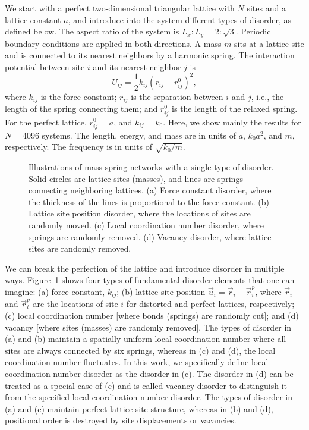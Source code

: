 \documentclass[twocolumn,printnumbers,amsmath,amssymb,prl,verbatim]{revtex4}
\begin{document}
We start with a perfect two-dimensional triangular lattice with $N$ sites and a lattice constant $a$, and introduce into the system different types of disorder, as defined below. The aspect ratio of the system is $L_x:L_y = 2: \sqrt{3}$. Periodic boundary conditions are applied in both directions. A mass $m$ sits at a lattice site and is connected to its nearest neighbors by a harmonic spring. The interaction potential between site $i$ and its nearest neighbor $j$ is
\begin{equation}
U_{ij} = \frac{1}{2}k_{ij}(r_{ij} - r_{ij}^0)^2,
\end{equation}
where $k_{ij}$ is the force constant; $r_{ij}$ is the separation between $i$ and $j$, i.e., the length of the spring connecting them; and $r_{ij}^0$ is the length of the relaxed spring. For the perfect lattice, $r_{ij}^0=a$, and $k_{ij}=k_0$. Here, we show mainly the results for $N=4096$ systems. The length, energy, and mass are in units of $a$, $k_0a^2$, and $m$, respectively. The frequency is in units of $\sqrt{k_0/m}$.

\begin{figure}
\caption{\label{fig:fig1} Illustrations of mass-spring networks with a single type of disorder. Solid circles are lattice sites (masses), and lines are springs connecting neighboring lattices. (a) Force constant disorder, where the thickness of the lines is proportional to the force constant. (b) Lattice site position disorder, where the locations of sites are randomly moved. (c) Local coordination number disorder, where springs are randomly removed. (d) Vacancy disorder, where lattice sites are randomly removed.
}
\end{figure}

We can break the perfection of the lattice and introduce disorder in multiple ways. Figure~\ref{fig:fig1} shows four types of fundamental disorder elements that one can imagine: (a) force constant, $k_{ij}$; (b) lattice site position $\vec{u}_i=\vec{r}_i-\vec{r}_i^p$, where $\vec{r}_i$ and $\vec{r}_i^p$ are the locations of site $i$ for distorted and perfect lattices, respectively; (c) local coordination number [where bonds (springs) are randomly cut]; and (d) vacancy [where sites (masses) are randomly removed]. The types of disorder in (a) and (b) maintain a spatially uniform local coordination number where all sites are always connected by six springs, whereas in (c) and (d), the local coordination number fluctuates. In this work, we specifically define local coordination number disorder as the disorder in (c). The disorder in (d) can be treated as a special case of (c) and is called vacancy disorder to distinguish it from the specified local coordination number disorder. The types of disorder in (a) and (c) maintain perfect lattice site structure, whereas in (b) and (d), positional order is destroyed by site displacements or vacancies.
\end{document}
